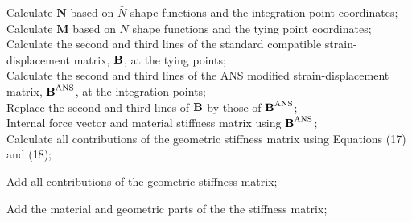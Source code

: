 \documentclass[12pt]{article}
\begin{document}
\begin{algorithm}
{	
	{
	Calculate $\boldsymbol{N}$ based on $\bar{N}$ shape functions and the integration point coordinates;\\
	Calculate $\boldsymbol{M}$ based on $\bar{N}$ shape functions and the tying point coordinates;\\
	Calculate the second and third lines of the standard compatible strain-displacement matrix, $\text{\bf{B}}$, at the tying points;\\

	}
	Calculate the second and third lines of the ANS modified strain-displacement matrix, $\text{\bf{B}}^{\text{ANS}}$, at the integration points;\\
	Replace the second and third lines of $\text{\bf{B}}$ by those of $\text{\bf{B}}^{\text{ANS}}$;\\
	Internal force vector and material stiffness matrix using $\text{\bf{B}}^{\text{ANS}}$;\\
	{
	Calculate all contributions of the geometric stiffness matrix using Equations (17) and (18);\\
	}

	Add all contributions of the geometric stiffness matrix;\\

}
	Add the material and geometric parts of the the stiffness matrix;
\end{algorithm}
\end{document}
